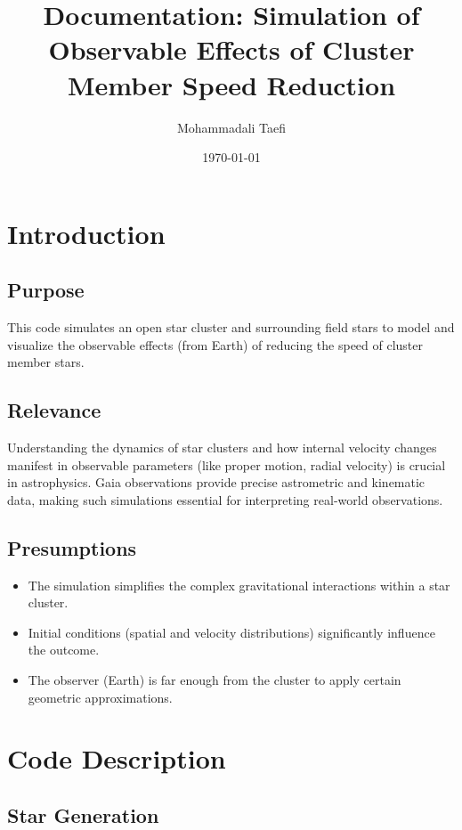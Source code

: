 \documentclass{article}
\title{Documentation: Simulation of Observable Effects of Cluster Member Speed Reduction}
\author{Mohammadali Taefi}
\date{\today}
\begin{document}
	
	\maketitle
	
	\section{Introduction}
	
	\subsection{Purpose}
	
	This code simulates an open star cluster and surrounding field stars to model and visualize the observable effects (from Earth) of reducing the speed of cluster member stars. 
	
	\subsection{Relevance}
	
	Understanding the dynamics of star clusters and how internal velocity changes manifest in observable parameters (like proper motion, radial velocity) is crucial in astrophysics. Gaia observations provide precise astrometric and kinematic data, making such simulations essential for interpreting real-world observations.
	
	\subsection{Presumptions}
	
	\begin{itemize}
		\item The simulation simplifies the complex gravitational interactions within a star cluster.
		\item Initial conditions (spatial and velocity distributions) significantly influence the outcome.
		\item The observer (Earth) is far enough from the cluster to apply certain geometric approximations.
	\end{itemize}
	
	\section{Code Description}
	
	\subsection{Star Generation}
	
\end{document}

